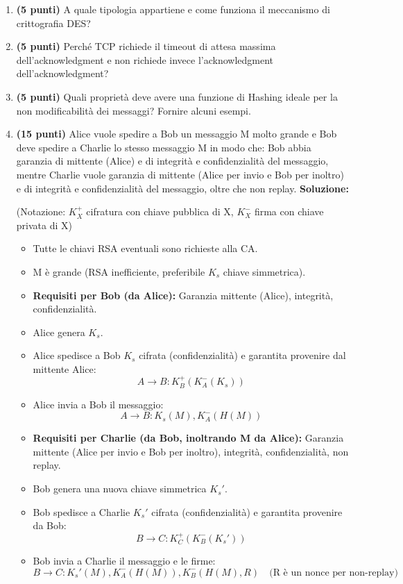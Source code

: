 \documentclass[12pt,a4paper]{article}
\begin{document}
\begin{enumerate}[label=\textbf{\arabic*.}, wide, labelindent=0pt, leftmargin=*]
    \item \textbf{(5 punti)} A quale tipologia appartiene e come funziona il meccanismo di crittografia DES?

    \item \textbf{(5 punti)} Perché TCP richiede il timeout di attesa massima dell'acknowledgment e non richiede invece l'acknowledgment dell'acknowledgment?

    \item \textbf{(5 punti)} Quali proprietà deve avere una funzione di Hashing ideale per la non modificabilità dei messaggi? Fornire alcuni esempi.

    \item \textbf{(15 punti)} Alice vuole spedire a Bob un messaggio M molto grande e Bob deve spedire a Charlie lo stesso messaggio M in modo che: Bob abbia garanzia di mittente (Alice) e di integrità e confidenzialità del messaggio, mentre Charlie vuole garanzia di mittente (Alice per invio e Bob per inoltro) e di integrità e confidenzialità del messaggio, oltre che non replay.
    \newline\textbf{Soluzione:}
    \par (Notazione: $K_X^+$ cifratura con chiave pubblica di X, $K_X^-$ firma con chiave privata di X)
    \begin{itemize}
        \item Tutte le chiavi RSA eventuali sono richieste alla CA.
        \item M è grande (RSA inefficiente, preferibile $K_s$ chiave simmetrica).
        \item \textbf{Requisiti per Bob (da Alice):} Garanzia mittente (Alice), integrità, confidenzialità.
        \item Alice genera $K_s$.
        \item Alice spedisce a Bob $K_s$ cifrata (confidenzialità) e garantita provenire dal mittente Alice:
        \[ A \rightarrow B: K_B^+(K_A^-(K_s)) \]
        \item Alice invia a Bob il messaggio:
        \[ A \rightarrow B: K_s(M), K_A^-(H(M)) \]
        \item \textbf{Requisiti per Charlie (da Bob, inoltrando M da Alice):} Garanzia mittente (Alice per invio e Bob per inoltro), integrità, confidenzialità, non replay.
        \item Bob genera una nuova chiave simmetrica $K_s'$.
        \item Bob spedisce a Charlie $K_s'$ cifrata (confidenzialità) e garantita provenire da Bob:
        \[ B \rightarrow C: K_C^+(K_B^-(K_s')) \]
        \item Bob invia a Charlie il messaggio e le firme:
        \[ B \rightarrow C: K_s'(M), K_A^-(H(M)), K_B^-(H(M), R) \quad \text{(R è un nonce per non-replay)} \]
    \end{itemize}


\end{enumerate}
\end{document}
